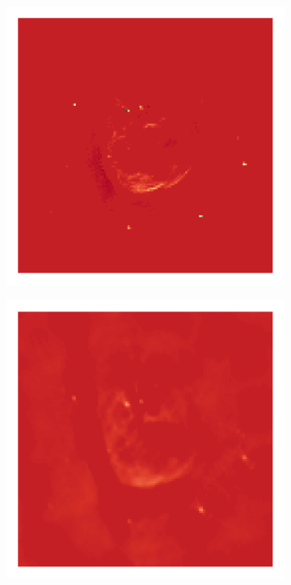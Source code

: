 \begin{figure}[h]
	\begin{subfigure}[b]{0.3\linewidth}
		\includegraphics[width=\linewidth, trim={18px 19px 18px 18px}, clip]{./chapters/05.results/g55/clean_model.png}
	\end{subfigure}
	\begin{subfigure}[b]{0.3\linewidth}
		\includegraphics[width=\linewidth, trim={18px 19px 18px 18px}, clip]{./chapters/05.results/g55/L2_model.png}

\end{subfigure}
\end{figure}
